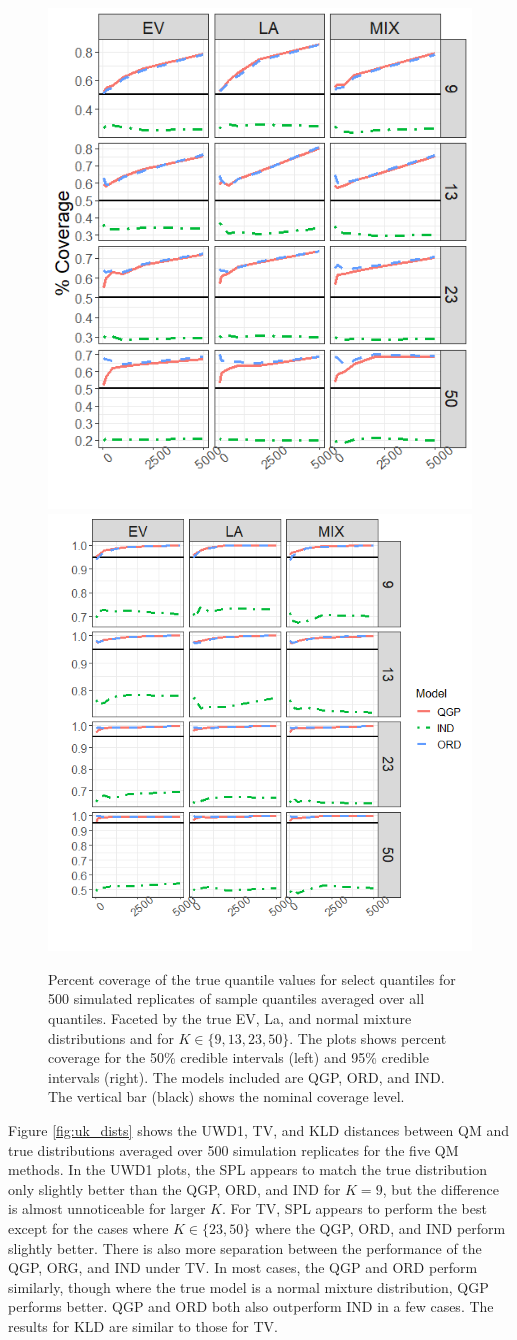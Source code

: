 \documentclass[preprint,12pt,authoryear]{elsarticle}
\begin{document}
\begin{figure}[hbt!]
  \includegraphics[width=.4\linewidth]{Images/uk_cover50.png}
  \includegraphics[width=.4\linewidth]{Images/uk_cover95.png}
\caption{Percent coverage of the true quantile values for select quantiles for 500 simulated replicates of sample quantiles averaged over all quantiles. Faceted by the true EV, La, and normal mixture distributions and for $K \in \{9, 13, 23, 50\}$. The plots shows percent coverage for the 50\% credible intervals (left) and 95\% credible intervals (right). The models included are QGP, ORD, and IND. The vertical bar (black) shows the nominal coverage level.}
\label{fig:uk_cover}
\end{figure}





Figure \ref{fig:uk_dists} shows the UWD1, TV, and KLD distances between QM and true distributions averaged over 500 simulation replicates for the five QM methods. In the UWD1 plots, the SPL appears to match the true distribution only slightly better than the QGP, ORD, and IND for $K = 9$, but the difference is almost unnoticeable for larger $K$. For TV, SPL appears to perform the best except for the cases where $K \in\{23, 50\}$ where the QGP, ORD, and IND perform slightly better. There is also more separation between the performance of the QGP, ORG, and IND under TV. In most cases, the QGP and ORD perform similarly, though where the true model is a normal mixture distribution, QGP performs better. QGP and ORD both also outperform IND in a few cases. The results for KLD are similar to those for TV.
\end{document}
